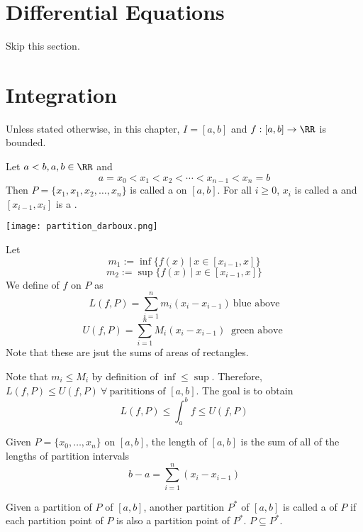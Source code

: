 \documentclass[12pt]{scrartcl}
\begin{document}
\section{Differential Equations}

Skip this section.

\section{Integration}

\begin{remark}
  Unless stated otherwise, in this chapter, $I = [a,b]$ 
  and $f: [a,b] \to \RR$ is bounded.
\end{remark}

\begin{definition}
  Let $a < b, a, b \in \RR$ and 
  \[a = x_0 < x_1 < x_2 < \cdots < x_{n-1} < x_n = b\]
  Then $P = \{x_1, x_1, x_2, \ldots, x_n\}$ is called a 
   on $[a,b]$. For all $i \geq 0$, 
  $x_i$ is called a  and $[x_{i-1}, x_i]$
  is a .
\end{definition}

\texttt{[image: partition\_darboux.png]}

\begin{definition}
  Let
  \[m_1 := \inf\{f(x) \ | \ x \in [x_{i-1}, x]\}\]
  \[m_2 := \sup\{f(x) \ | \ x \in [x_{i-1}, x]\}\]
  We define  of $f$ on $P$ as 
  \[L(f, P) = \sum_{i=1}^n m_i (x_i - x_{i-1}) \ \text{blue above}\]
  \[U(f, P) = \sum_{i=1}^n M_i(x_i - x_{i-1}) \ \text{ green above }\]
Note that these are jsut the sums of areas of rectangles.
\end{definition}

\begin{note}
  Note that $m_i \leq M_i$ by definition of $\inf \leq \sup$. 
  Therefore, $L(f, P) \leq U(f, P) \ \forall \ \text{parititions of } [a,b]$. 
  The goal is to obtain 
  \[L(f, P) \leq \int_a^b f \leq U(f, P)\]
\end{note}

\begin{note}
  Given $P = \{x_0, \ldots, x_n\}$ on $[a,b]$, the 
  length of $[a,b]$ is the sum of all of the lengths of partition 
  intervals 
  \[b-a = \sum_{i=1}^n (x_i - x_{i-1})\]
\end{note}

\begin{definition}
  Given a partition of $P$ of $[a,b]$, another 
  partition $P^*$ of $[a,b]$ is called a  of $P$
  if each partition point of $P$ is also a partition point of $P^*$. $P \subseteq P^*$.
\end{definition}
\end{document}
